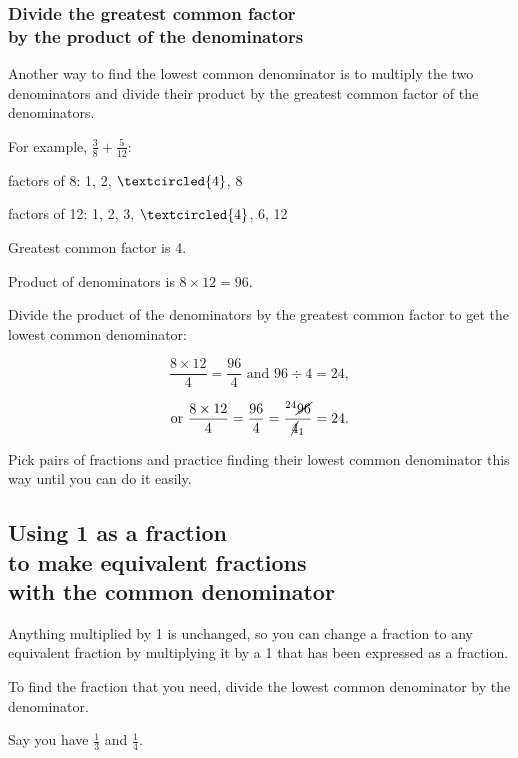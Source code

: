 \documentclass[16pt]{article}
\begin{document}
\begin{spacing}{1.25}
\subsubsection*{Divide the greatest common factor\\ by the product of the denominators} Another way to find the lowest common denominator is to multiply the two denominators and divide their product by the greatest common factor of the denominators.

\begin{onehalfspacing}
For example, $\frac{3}{8} + \frac{5}{12}$:

factors of 8: 1, 2, $\textcircled{4}$, 8

factors of 12: 1, 2, 3, $\textcircled{4}$, 6, 12

Greatest common factor is 4.

Product of denominators is $8 \times 12 = 96$.

Divide the product of the denominators by the greatest common factor to get the lowest common denominator:

$$\frac{8 \times 12}{4} = \frac{96}{4}\text{ and } 96 \div 4 = 24,$$

$$\text{or }\frac{8 \times 12}{4} = \frac{96}{4} = \frac{^{24}\cancel{96}}{\cancel{4}_1} = 24.$$
\end{onehalfspacing}

\vspace{28pt}
Pick pairs of fractions and practice finding their lowest common denominator this way until you can do it easily.

\pagebreak

\subsection*{Using 1 as a fraction\\to make equivalent fractions\\with the common denominator}
Anything multiplied by 1 is unchanged, so you can change a fraction to any equivalent fraction by multiplying it by a 1 that has been expressed as a fraction.

\vspace{20}
To find the fraction that you need, divide the lowest common denominator by the denominator.

\vspace{20}
\begin{doublespace}
Say you have $\frac{1}{3}$ and $\frac{1}{4}$.


\end{doublespace}
\end{spacing}
\end{document}
